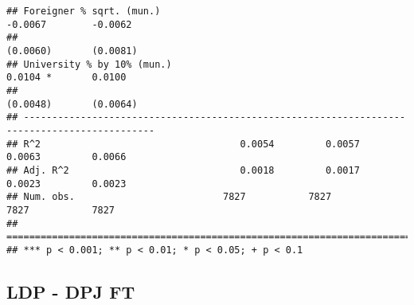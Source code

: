 \documentclass[
]{article}
\begin{document}
\begin{verbatim}
## Foreigner % sqrt. (mun.)                                           -0.0067        -0.0062    
##                                                                    (0.0060)       (0.0081)   
## University % by 10% (mun.)                                          0.0104 *       0.0100    
##                                                                    (0.0048)       (0.0064)   
## ---------------------------------------------------------------------------------------------
## R^2                                   0.0054         0.0057         0.0063         0.0066    
## Adj. R^2                              0.0018         0.0017         0.0023         0.0023    
## Num. obs.                          7827           7827           7827           7827         
## =============================================================================================
## *** p < 0.001; ** p < 0.01; * p < 0.05; + p < 0.1
\end{verbatim}

\hypertarget{ldp---dpj-ft}{%
\subsection{LDP - DPJ FT}\label{ldp---dpj-ft}}
\end{document}

